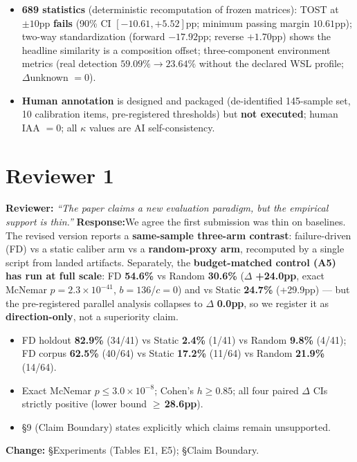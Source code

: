 \documentclass[11pt]{article}
\newcommand{\rev}[1]{\textbf{\color{blue}Reviewer:} \emph{``#1''}}
\newcommand{\resp}{\textbf{\color{red}Response:}}
\newcommand{\chg}[1]{\textbf{Change:} #1}
\begin{document}
\begin{itemize}[leftmargin=1.4em]
  \item \textbf{689 statistics} (deterministic recomputation of frozen matrices): TOST at $\pm10$pp
        \textbf{fails} (90\% CI $[-10.61,+5.52]$pp; minimum passing margin $10.61$pp); two-way
        standardization (forward $-17.92$pp; reverse $+1.70$pp) shows the headline similarity is a
        composition offset; three-component environment metrics (real detection
        $59.09\%\to23.64\%$ without the declared WSL profile; $\Delta$unknown $=0$).
  \item \textbf{Human annotation} is designed and packaged (de-identified 145-sample set,
        10 calibration items, pre-registered thresholds) but \textbf{not executed}; human IAA $=0$;
        all $\kappa$ values are AI self-consistency.
\end{itemize}

\section*{Reviewer 1}

\rev{The paper claims a new evaluation paradigm, but the empirical support is thin.}
\resp We agree the first submission was thin on baselines. The revised version reports a
\textbf{same-sample three-arm contrast}: failure-driven (FD) vs a static caliber arm vs a
\textbf{random-proxy arm}, recomputed by a single script from landed artifacts. Separately, the
\textbf{budget-matched control (A5) has run at full scale}: FD \textbf{54.6\%} vs Random
\textbf{30.6\%} ($\Delta$ \textbf{+24.0pp}, exact McNemar $p{=}2.3\times10^{-41}$, $b{=}136$/$c{=}0$)
and vs Static \textbf{24.7\%} (+29.9pp) --- but the pre-registered parallel analysis collapses to
$\Delta$ \textbf{0.0pp}, so we register it as \textbf{direction-only}, not a superiority claim.
\begin{itemize}[leftmargin=1.4em]
  \item FD holdout \textbf{82.9\%} (34/41) vs Static \textbf{2.4\%} (1/41) vs Random \textbf{9.8\%} (4/41);
        FD corpus \textbf{62.5\%} (40/64) vs Static \textbf{17.2\%} (11/64) vs Random \textbf{21.9\%} (14/64).
  \item Exact McNemar $p\le3.0\times10^{-8}$; Cohen's $h\ge0.85$; all four paired $\Delta$ CIs strictly
        positive (lower bound $\ge$\,\textbf{28.6pp}).
  \item \S9 (Claim Boundary) states explicitly which claims remain unsupported.
\end{itemize}
\chg{\S Experiments (Tables E1, E5); \S Claim Boundary.}
\end{document}
